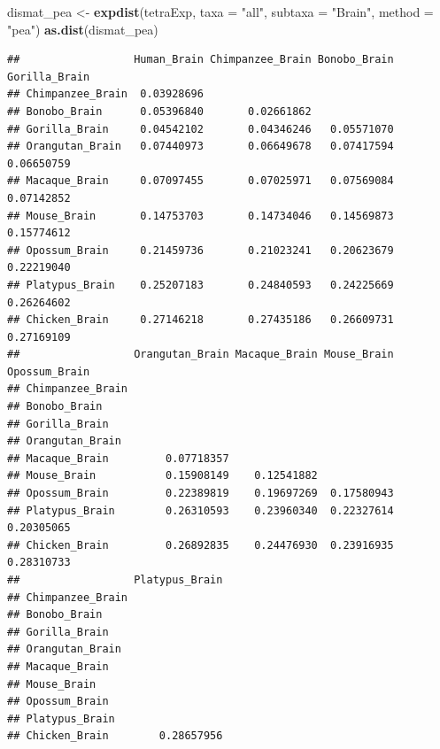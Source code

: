 \documentclass[]{book}
\newenvironment{Shaded}{\begin{snugshade}}{\end{snugshade}}
\newcommand{\DataTypeTok}[1]{\textcolor[rgb]{0.13,0.29,0.53}{#1}}
\newcommand{\KeywordTok}[1]{\textcolor[rgb]{0.13,0.29,0.53}{\textbf{#1}}}
\newcommand{\NormalTok}[1]{#1}
\newcommand{\StringTok}[1]{\textcolor[rgb]{0.31,0.60,0.02}{#1}}
\begin{document}
\begin{Shaded}
\begin{Highlighting}[]
\NormalTok{dismat_pea <-}\StringTok{ }\KeywordTok{expdist}\NormalTok{(tetraExp, }\DataTypeTok{taxa =} \StringTok{"all"}\NormalTok{,}
                 \DataTypeTok{subtaxa =} \StringTok{"Brain"}\NormalTok{,}
                 \DataTypeTok{method =} \StringTok{"pea"}\NormalTok{)}
\KeywordTok{as.dist}\NormalTok{(dismat_pea)}
\end{Highlighting}
\end{Shaded}

\begin{verbatim}
##                  Human_Brain Chimpanzee_Brain Bonobo_Brain Gorilla_Brain
## Chimpanzee_Brain  0.03928696                                            
## Bonobo_Brain      0.05396840       0.02661862                           
## Gorilla_Brain     0.04542102       0.04346246   0.05571070              
## Orangutan_Brain   0.07440973       0.06649678   0.07417594    0.06650759
## Macaque_Brain     0.07097455       0.07025971   0.07569084    0.07142852
## Mouse_Brain       0.14753703       0.14734046   0.14569873    0.15774612
## Opossum_Brain     0.21459736       0.21023241   0.20623679    0.22219040
## Platypus_Brain    0.25207183       0.24840593   0.24225669    0.26264602
## Chicken_Brain     0.27146218       0.27435186   0.26609731    0.27169109
##                  Orangutan_Brain Macaque_Brain Mouse_Brain Opossum_Brain
## Chimpanzee_Brain                                                        
## Bonobo_Brain                                                            
## Gorilla_Brain                                                           
## Orangutan_Brain                                                         
## Macaque_Brain         0.07718357                                        
## Mouse_Brain           0.15908149    0.12541882                          
## Opossum_Brain         0.22389819    0.19697269  0.17580943              
## Platypus_Brain        0.26310593    0.23960340  0.22327614    0.20305065
## Chicken_Brain         0.26892835    0.24476930  0.23916935    0.28310733
##                  Platypus_Brain
## Chimpanzee_Brain               
## Bonobo_Brain                   
## Gorilla_Brain                  
## Orangutan_Brain                
## Macaque_Brain                  
## Mouse_Brain                    
## Opossum_Brain                  
## Platypus_Brain                 
## Chicken_Brain        0.28657956
\end{verbatim}
\end{document}
